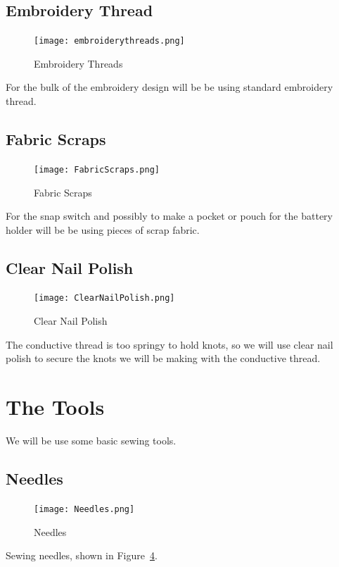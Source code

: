 \documentclass[letterpaper,twoside,12pt]{article}
\begin{document}
\subsection{Embroidery Thread}
\begin{figure}[hbpt]\begin{centering}%
\texttt{[image: embroiderythreads.png]}
\caption{Embroidery Threads}
\label{fig:embroiderythreads}
\end{centering}\end{figure}
For the bulk of the embroidery design will be be using standard embroidery 
thread.
\clearpage
\subsection{Fabric Scraps}
\begin{figure}[hbpt]\begin{centering}%
\texttt{[image: FabricScraps.png]}
\caption{Fabric Scraps}
\label{fig:fabricscraps}
\end{centering}\end{figure}
For the snap switch and possibly to make a pocket or pouch for the battery 
holder will be be using pieces of scrap fabric.
\clearpage
\subsection{Clear Nail Polish}
\begin{figure}[hbpt]\begin{centering}%
\texttt{[image: ClearNailPolish.png]}
\caption{Clear Nail Polish}
\label{fig:clearnailpolish}
\end{centering}\end{figure}
The conductive thread is too springy to hold knots, so we will use clear nail 
polish to secure the knots we will be making with the conductive thread.
\clearpage
\section{The Tools}
We will be use some basic sewing tools.
\subsection{Needles}
\begin{figure}[hbpt]\begin{centering}%
\texttt{[image: Needles.png]}
\caption{Needles}
\label{fig:needles}
\end{centering}\end{figure}
Sewing needles, shown in Figure~\ref{fig:needles}.
\clearpage
\end{document}
